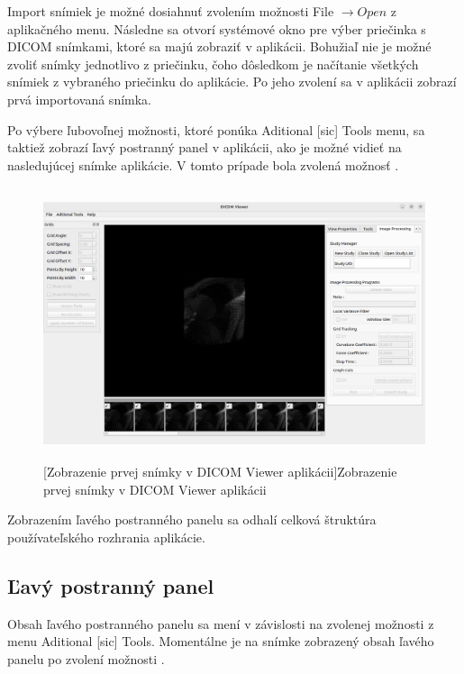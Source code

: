{Import snímiek je možné dosiahnuť zvolením možnosti File $\rightarrow{  Open}$ z aplikačného menu. Následne sa otvorí systémové okno pre výber priečinka s DICOM snímkami, ktoré sa majú zobraziť v aplikácii. Bohužiaľ nie je možné zvoliť snímky jednotlivo z priečinku, čoho dôsledkom je načítanie všetkých snímiek z vybraného priečinku do aplikácie. Po jeho zvolení sa v aplikácii zobrazí prvá importovaná snímka.

Po výbere ľubovoľnej možnosti, ktoré ponúka Aditional [sic] Tools menu, sa taktiež zobrazí ľavý postranný panel v aplikácii, ako je možné vidieť na nasledujúcej snímke aplikácie. V tomto prípade bola zvolená možnosť .

\begin {figure}[ht]
        \centering
        \includegraphics[height=8cm]{media/existing_app/app_with_grids_panel.png}
        \captionsetup{justification=centering}
        [Zobrazenie prvej snímky v DICOM Viewer aplikácii]{Zobrazenie prvej snímky v DICOM Viewer aplikácii}
\end {figure}

Zobrazením ľavého postranného panelu sa odhalí celková štruktúra používateľského rozhrania aplikácie.

\clearpage

\subsection {Ľavý postranný panel}\label{left_sidebar}
Obsah ľavého postranného panelu sa mení v závislosti na zvolenej možnosti z menu Aditional [sic] Tools. Momentálne je na snímke zobrazený obsah ľavého panelu po zvolení možnosti .

}
